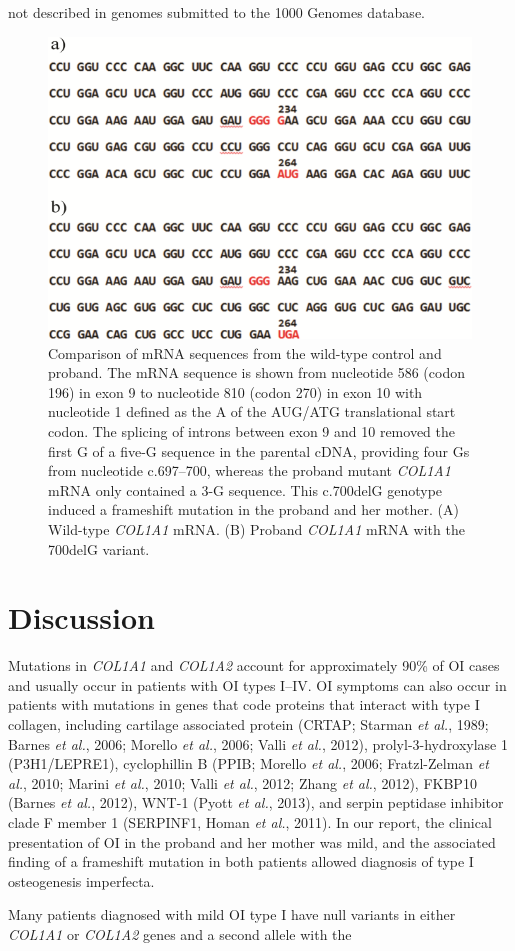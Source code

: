 not described in genomes submitted to the 1000 Genomes database. \begin{figure}[!h] \centering \includegraphics[width=\textwidth]{1415-4757-gmb-38-1-1-gf03.png} \caption{Comparison of mRNA sequences from the wild-type control and proband. The mRNA sequence is shown from nucleotide 586 (codon 196) in exon 9 to nucleotide 810 (codon 270) in exon 10 with nucleotide 1 defined as the A of the AUG/ATG translational start codon. The splicing of introns between exon 9 and 10 removed the first G of a five-G sequence in the parental cDNA, providing four Gs from nucleotide c.697–700, whereas the proband mutant \textit{COL1A1} mRNA only contained a 3-G sequence. This c.700delG genotype induced a frameshift mutation in the proband and her mother. (A) Wild-type \textit{COL1A1} mRNA. (B) Proband \textit{COL1A1} mRNA with the 700delG variant.} \label{Figure 3} \end{figure} \section*{Discussion}\par Mutations in \textit{COL1A1} and \textit{COL1A2} account for approximately 90\% of OI cases and usually occur in patients with OI types I–IV. OI symptoms can also occur in patients with mutations in genes that code proteins that interact with type I collagen, including cartilage associated protein (CRTAP; Starman \textit{et al.}, 1989; Barnes \textit{et al.}, 2006; Morello \textit{et al.}, 2006; Valli \textit{et al.}, 2012), prolyl-3-hydroxylase 1 (P3H1/LEPRE1), cyclophillin B (PPIB; Morello \textit{et al.}, 2006; Fratzl-Zelman \textit{et al.}, 2010; Marini \textit{et al.}, 2010; Valli \textit{et al.}, 2012; Zhang \textit{et al.}, 2012), FKBP10 (Barnes \textit{et al.}, 2012), WNT-1 (Pyott \textit{et al.}, 2013), and serpin peptidase inhibitor clade F member 1 (SERPINF1, Homan \textit{et al.}, 2011). In our report, the clinical presentation of OI in the proband and her mother was mild, and the associated finding of a frameshift mutation in both patients allowed diagnosis of type I osteogenesis imperfecta.\par Many patients diagnosed with mild OI type I have null variants in either \textit{COL1A1} or \textit{COL1A2} genes and a second allele with the 